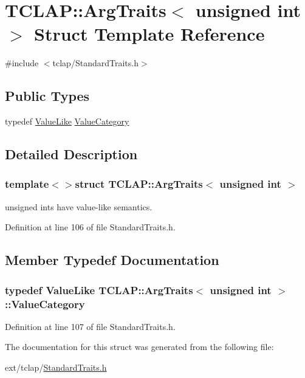 \hypertarget{struct_t_c_l_a_p_1_1_arg_traits_3_01unsigned_01int_01_4}{}\section{T\+C\+L\+A\+P\+:\+:Arg\+Traits$<$ unsigned int $>$ Struct Template Reference}
\label{struct_t_c_l_a_p_1_1_arg_traits_3_01unsigned_01int_01_4}


{\ttfamily \#include $<$tclap/\+Standard\+Traits.\+h$>$}

\subsection*{Public Types}
\begin{DoxyCompactItemize}
\item 
typedef \hyperlink{struct_t_c_l_a_p_1_1_value_like}{Value\+Like} \hyperlink{struct_t_c_l_a_p_1_1_arg_traits_3_01unsigned_01int_01_4_ae95cdc132665581c458fc64c7e7a0490}{Value\+Category}
\end{DoxyCompactItemize}


\subsection{Detailed Description}
\subsubsection*{template$<$$>$struct T\+C\+L\+A\+P\+::\+Arg\+Traits$<$ unsigned int $>$}

unsigned ints have value-\/like semantics. 

Definition at line 106 of file Standard\+Traits.\+h.



\subsection{Member Typedef Documentation}
\hypertarget{struct_t_c_l_a_p_1_1_arg_traits_3_01unsigned_01int_01_4_ae95cdc132665581c458fc64c7e7a0490}{}
\subsubsection[{Value\+Category}]{\setlength{\rightskip}{0pt plus 5cm}typedef {\bf Value\+Like} {\bf T\+C\+L\+A\+P\+::\+Arg\+Traits}$<$ unsigned int $>$\+::{\bf Value\+Category}}\label{struct_t_c_l_a_p_1_1_arg_traits_3_01unsigned_01int_01_4_ae95cdc132665581c458fc64c7e7a0490}


Definition at line 107 of file Standard\+Traits.\+h.



The documentation for this struct was generated from the following file\+:\begin{DoxyCompactItemize}
\item 
ext/tclap/\hyperlink{_standard_traits_8h}{Standard\+Traits.\+h}\end{DoxyCompactItemize}
